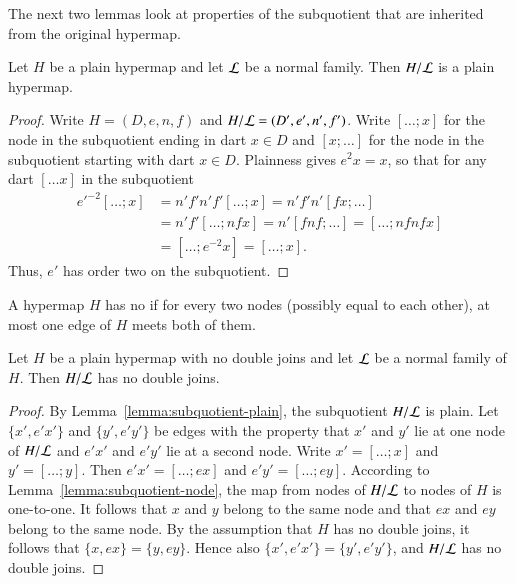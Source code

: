 The next two lemmas look at properties of the subquotient that are
inherited from the original hypermap.

\begin{lemma}\label{lemma:subquotient-plain}
Let $H$ be a plain hypermap and let $\cal L$ be a
normal family.  Then $H/{\cal L}$ is a plain hypermap.
\end{lemma}

\begin{proof}  Write $H=(D,e,n,f)$ and $H/{\cal L} = (D',e',n',f')$.  
Write $[\ldots; x]$ for the node in
the subquotient ending in dart $x\in D$ and $[x;\ldots]$ for the node
in the subquotient starting with dart $x\in D$.  Plainness gives $e^2 x
= x$, so that for any dart $[\ldots x]$ in the subquotient
\begin{align*}
{e'}^{-2} [\ldots; x] &= n' f' n' f' [\ldots; x] = n' f' n' [f x; \ldots] \\&=
n' f' [\ldots; n f x] = n' [f n f; \ldots] = [\ldots; n f n f x]\\ &=
[\ldots; e^{-2} x] = [\ldots; x].
\end{align*}
Thus, $e'$ has order two on the subquotient.
\end{proof}




\begin{definition}\label{def:ndj}
A hypermap $H$ has no 
if for every two nodes (possibly equal to each other), 
 at most one edge of $H$  meets both of them.
\end{definition}


\begin{lemma}
Let $H$ be a plain hypermap with no double joins and let ${\cal L}$ be a normal
family of $H$.  Then $H/{\cal L}$ has no double joins.
\end{lemma}

\begin{proof} \hspace{-5.5pt}By Lemma~\ref{lemma:subquotient-plain}, the subquotient
  $H/{\cal L}$ is plain.  Let $\{x',e'x'\}$ and $\{y',e'y'\}$ be edges
  with the property that $x'$ and $y'$ lie at one node of $H/{\cal L}$
  and $e'x'$ and $e'y'$ lie at a second node.  Write $x' =
  [\ldots;x]$ and $y' = [\ldots;y]$.  Then $e'x' = [\ldots;e x]$ and
  $e'y' = [\ldots;e y]$.  According to
  Lemma~\ref{lemma:subquotient-node}, the map from
  nodes of $H/{\cal L}$ to nodes of $H$ is one-to-one.  It follows that $x$ and $y$
  belong to the same node and that $e x$ and $e y$ belong to the same
   node.  By the assumption that $H$ has no double joins,
  it follows that $\{x,ex\}=\{y,ey\}$.  Hence also $\{x',e'x'\} = \{y',e'y'\}$, 
  and $H/{\cal L}$ has
  no double joins.
\end{proof}


